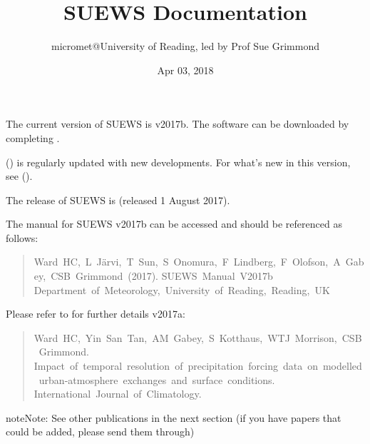 \documentclass[letterpaper,10pt,english]{sphinxmanual}
\title{SUEWS Documentation}
\date{Apr 03, 2018}
\author{micromet@University of Reading, led by Prof Sue Grimmond}
\begin{document}
\maketitle
\sphinxtableofcontents
{}\label{\detokenize{index::doc}}


The current version of SUEWS is v2017b. The software can be downloaded
by completing .

{\hyperref[\detokenize{index:index-page}]{}} () is regularly
updated with new developments. For what’s new in this version, see {\hyperref[\detokenize{version-history:new-latest}]{}} ().

The  release of SUEWS is  (released 1 August
2017).

The manual for SUEWS v2017b can be accessed
 and should be referenced as
follows:
\begin{quote}

Ward HC, L Järvi, T Sun, S Onomura, F Lindberg, F Olofson, A Gabey, CSB Grimmond (2017).
SUEWS Manual V2017b Department of Meteorology, University of Reading, Reading, UK
\end{quote}

Please refer to  for
further details v2017a:
\begin{quote}

Ward HC, Yin San Tan, AM Gabey, S Kotthaus, WTJ Morrison, CSB Grimmond.
Impact of temporal resolution of precipitation forcing data on modelled urban-atmosphere exchanges and surface conditions.
International Journal of Climatology.
\end{quote}

\begin{sphinxadmonition}{note}{Note:}
See other publications in the next section (if you have papers that could be added, please send them through)
\end{sphinxadmonition}
\end{document}
